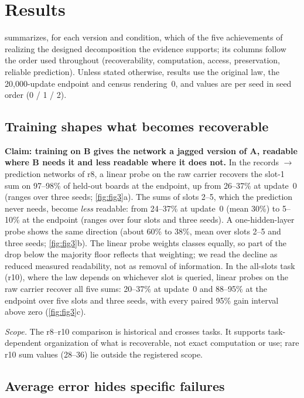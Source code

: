 \section{Results}\label{sec:results}


 summarizes, for each version and condition, which of the
five achievements of realizing the designed decomposition the evidence
supports; its columns follow the order used throughout (recoverability, computation, access,
preservation, reliable prediction). Unless stated otherwise, results
use the original law, the 20,000-update endpoint and census rendering~0,
and values are per seed in seed order (0 / 1 / 2).

\subsection{Training shapes what becomes recoverable}\label{sec:res-recover}


\textbf{Claim: training on B gives the network a jagged version of A,
readable where B needs it and less readable where it does not.} In the
records $\to$ prediction networks of r8, a linear probe on the raw carrier
recovers the slot-1 sum on 97--98\% of held-out boards at the endpoint, up
from 26--37\% at update~0 (ranges over three seeds; \cref{fig:fig3}a). The sums of slots 2--5, which
the prediction never needs, become \emph{less} readable: from 24--37\% at
update~0 (mean 30\%) to 5--10\% at the endpoint (ranges over four slots
and three seeds). A one-hidden-layer probe shows the same
direction (about 60\% to 38\%, mean over slots 2--5 and three seeds;
\cref{fig:fig3}b). The linear probe weights classes equally, so part of the
drop below the majority floor reflects that weighting; we read the decline as
reduced measured readability, not as removal of information. In the
all-slots task (r10), where the law depends on whichever slot is queried,
linear probes on the raw carrier recover all five sums: 20--37\% at
update~0 and 88--95\% at the endpoint over five slots and three seeds, with
every paired 95\% gain interval above zero (\cref{fig:fig3}c).

\emph{Scope.} The r8--r10 comparison is historical and crosses tasks. It
supports task-dependent organization of what is recoverable, not exact
computation or use; rare r10 sum values (28--36) lie outside the registered
scope.

\subsection{Average error hides specific failures}\label{sec:res-average}

